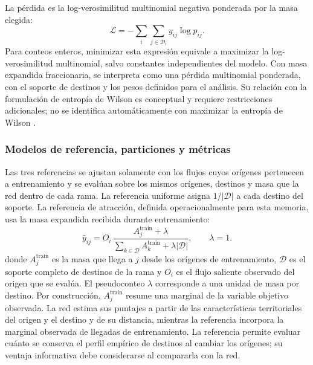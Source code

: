 La pérdida es la log-verosimilitud multinomial negativa ponderada por la masa elegida:
\begin{equation}
    \mathcal{L} = -\sum_{i}\sum_{j \in \mathcal{D}_i} y_{ij}\log p_{ij}.
    \label{eq:perdida_multinomial_santiago}
\end{equation}
Para conteos enteros, minimizar esta expresión equivale a maximizar la log-verosimilitud multinomial, salvo constantes independientes del modelo. Con masa expandida fraccionaria, se interpreta como una pérdida multinomial ponderada, con el soporte de destinos y los pesos definidos para el análisis. Su relación con la formulación de entropía de Wilson es conceptual y requiere restricciones adicionales; no se identifica automáticamente con maximizar la entropía de Wilson \cite{wilson1970entropy}.

\subsubsection{Modelos de referencia, particiones y métricas}

Las tres referencias se ajustan solamente con los flujos cuyos orígenes pertenecen a entrenamiento y se evalúan sobre los mismos orígenes, destinos y masa que la red dentro de cada rama. La referencia uniforme asigna $1/|\mathcal{D}|$ a cada destino del soporte. La referencia de atracción, definida operacionalmente para esta memoria, usa la masa expandida recibida durante entrenamiento:
\begin{equation}
    \widehat y_{ij}=O_i\,
    \frac{A_j^{\mathrm{train}}+\lambda}
    {\sum_{k\in\mathcal{D}}A_k^{\mathrm{train}}+\lambda|\mathcal{D}|},
    \qquad \lambda=1.
    \label{eq:baseline_atraccion}
\end{equation}
donde $A_j^{\mathrm{train}}$ es la masa que llega a $j$ desde los orígenes de entrenamiento, $\mathcal{D}$ es el soporte completo de destinos de la rama y $O_i$ es el flujo saliente observado del origen que se evalúa. El pseudoconteo $\lambda$ corresponde a una unidad de masa por destino. Por construcción, $A_j^{\mathrm{train}}$ resume una marginal de la variable objetivo observada. La red estima sus puntajes a partir de las características territoriales del origen y el destino y de su distancia, mientras la referencia incorpora la marginal observada de llegadas de entrenamiento. La referencia permite evaluar cuánto se conserva el perfil empírico de destinos al cambiar los orígenes; su ventaja informativa debe considerarse al compararla con la red.

